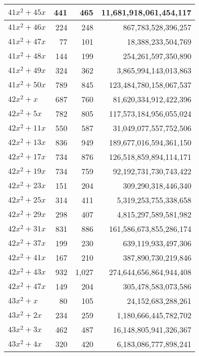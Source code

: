 \documentclass[a4paper]{amsproc}
\theoremstyle{plain}
\begin{document}
\begin{longtable}{ | l | r | r | r | }
$41x^2 + 45x$ & 441 & 465 & 11{,}681{,}918{,}061{,}454{,}117 \\ \hline
$41x^2 + 46x$ & 224 & 248 & 867{,}783{,}528{,}396{,}257 \\ \hline
$41x^2 + 47x$ & 77 & 101 & 18{,}388{,}233{,}504{,}769 \\ \hline
$41x^2 + 48x$ & 144 & 199 & 254{,}261{,}597{,}350{,}890 \\ \hline
$41x^2 + 49x$ & 324 & 362 & 3{,}865{,}994{,}143{,}013{,}863 \\ \hline
$41x^2 + 50x$ & 789 & 845 & 123{,}484{,}780{,}158{,}067{,}537 \\ \hline
$42x^2 + x$ & 687 & 760 & 81{,}620{,}334{,}912{,}422{,}396 \\ \hline
$42x^2 + 5x$ & 782 & 805 & 117{,}573{,}184{,}956{,}055{,}024 \\ \hline
$42x^2 + 11x$ & 550 & 587 & 31{,}049{,}077{,}557{,}752{,}506 \\ \hline
$42x^2 + 13x$ & 836 & 949 & 189{,}677{,}016{,}594{,}361{,}150 \\ \hline
$42x^2 + 17x$ & 734 & 876 & 126{,}518{,}859{,}894{,}114{,}171 \\ \hline
$42x^2 + 19x$ & 734 & 759 & 92{,}192{,}731{,}730{,}743{,}422 \\ \hline
$42x^2 + 23x$ & 151 & 204 & 309{,}290{,}318{,}446{,}340 \\ \hline
$42x^2 + 25x$ & 314 & 411 & 5{,}319{,}253{,}755{,}338{,}658 \\ \hline
$42x^2 + 29x$ & 298 & 407 & 4{,}815{,}297{,}589{,}581{,}982 \\ \hline
$42x^2 + 31x$ & 831 & 886 & 161{,}586{,}673{,}855{,}286{,}174 \\ \hline
$42x^2 + 37x$ & 199 & 230 & 639{,}119{,}933{,}497{,}306 \\ \hline
$42x^2 + 41x$ & 167 & 210 & 387{,}890{,}730{,}219{,}846 \\ \hline
$42x^2 + 43x$ & 932 & 1{,}027 & 274{,}644{,}656{,}864{,}944{,}408 \\ \hline
$42x^2 + 47x$ & 149 & 204 & 305{,}478{,}583{,}073{,}586 \\ \hline
$43x^2 + x$ & 80 & 105 & 24{,}152{,}683{,}288{,}261 \\ \hline
$43x^2 + 2x$ & 234 & 259 & 1{,}180{,}666{,}445{,}782{,}702 \\ \hline
$43x^2 + 3x$ & 462 & 487 & 16{,}148{,}805{,}941{,}326{,}367 \\ \hline
$43x^2 + 4x$ & 320 & 420 & 6{,}183{,}086{,}777{,}898{,}241 \\ \hline

\end{longtable}
\end{document}
